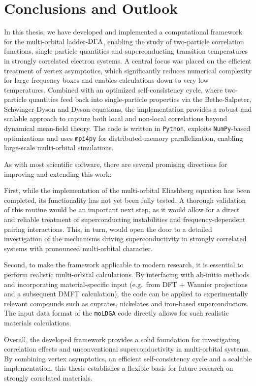 \documentclass[../../main.tex]{subfiles}
\begin{document}
\chapter{Conclusions and Outlook}\label{ch:conclusions_and_outlook}

In this thesis, we have developed and implemented a computational framework for the multi-orbital ladder-$\text{D}\Gamma\text{A}$, enabling the study of two-particle correlation functions, single-particle quantities and superconducting transition temperatures in strongly correlated electron systems. A central focus was placed on the efficient treatment of vertex asymptotics, which significantly reduces numerical complexity for large frequency boxes and enables calculations down to very low temperatures. Combined with an optimized self-consistency cycle, where two-particle quantities feed back into single-particle properties via the Bethe-Salpeter, Schwinger-Dyson and Dyson equations, the implementation provides a robust and scalable approach to capture both local and non-local correlations beyond dynamical mean-field theory. The code is written in \texttt{Python}, exploits \texttt{NumPy}-based optimizations and uses \texttt{mpi4py} for distributed-memory parallelization, enabling large-scale multi-orbital simulations.
\newline

As with most scientific software, there are several promising directions for improving and extending this work:
\newline

First, while the implementation of the multi-orbital Eliashberg equation has been completed, its functionality has not yet been fully tested. A thorough validation of this routine would be an important next step, as it would allow for a direct and reliable treatment of superconducting instabilities and frequency-dependent pairing interactions. This, in turn, would open the door to a detailed investigation of the mechanisms driving superconductivity in strongly correlated systems with pronounced multi-orbital character.
\newline

Second, to make the framework applicable to modern research, it is essential to perform realistic multi-orbital calculations. By interfacing with ab-initio methods and incorporating material-specific input (e.g.\ from DFT + Wannier projections and a subsequent DMFT calculation), the code can be applied to experimentally relevant compounds such as cuprates, nickelates and iron-based superconductors. The input data format of the \texttt{moLDGA} code directly allows for such realistic materials calculations.
\newline

Overall, the developed framework provides a solid foundation for investigating correlation effects and unconventional superconductivity in multi-orbital systems. By combining vertex asymptotics, an efficient self-consistency cycle and a scalable implementation, this thesis establishes a flexible basis for future research on strongly correlated materials.
\end{document}
